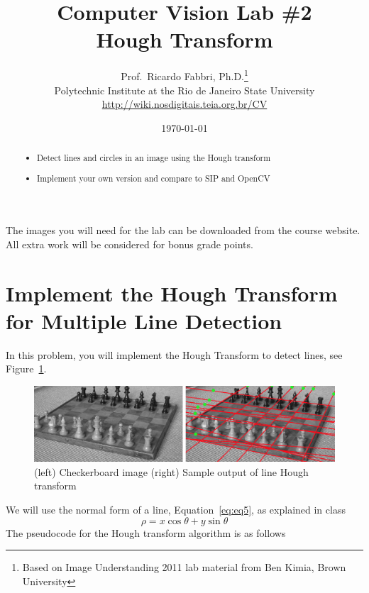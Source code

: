 \documentclass[a4paper]{article}
\begin{document}
\title{\textsf{Computer Vision Lab \#2\\ Hough Transform}
} 

\author{Prof.\ Ricardo Fabbri, Ph.D.\footnote{Based on Image Understanding
2011 lab material from Ben Kimia, Brown University}\\[1em]
Polytechnic Institute at the Rio de Janeiro State University\\
\url{http://wiki.nosdigitais.teia.org.br/CV}
}
 

\date{\today}
\maketitle
\begin{abstract}
\noindent\begin{itemize}
\item Detect lines and circles in an image using the Hough transform
\item Implement your own version and compare to SIP and OpenCV
\end{itemize}
\end{abstract}
\vspace{2em}



The images you will need for the lab can be downloaded from the course
website. All extra work will be considered for bonus grade points.

\section{Implement the Hough Transform for Multiple Line Detection}

In this problem, you will implement the Hough Transform to detect lines, see
Figure~\ref{fig:img5}.
\begin{figure}[t]
\centering
\includegraphics[width=0.8\linewidth]{figs/line-hough.png}%
\caption{%
(left) Checkerboard image (right) Sample output of line Hough transform
}\label{fig:img5}
\end{figure}
We will use the normal form of a line, Equation~\ref{eq:eq5}, as explained in
class
\begin{equation}\label{eq:eq5}
\rho = x\cos\theta + y\sin\theta
\end{equation}
The pseudocode for the Hough transform algorithm is as follows
\end{document}

